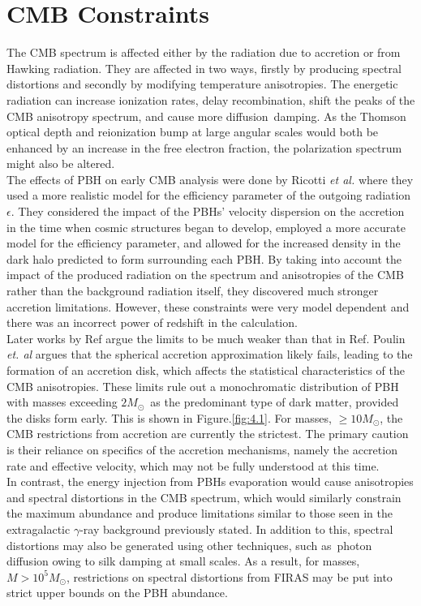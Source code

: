 \section{CMB Constraints}
The CMB spectrum is affected either by the radiation due to accretion or from Hawking radiation. They are affected in two ways, firstly by producing spectral distortions and secondly by modifying temperature anisotropies. The energetic radiation can increase ionization rates, delay recombination, shift the peaks of the CMB anisotropy spectrum, and cause more diffusion damping. As the Thomson optical depth and reionization bump at large angular scales would both be enhanced by an increase in the free electron fraction, the polarization spectrum might also be altered.\\
The effects of PBH on early CMB analysis were done by Ricotti \emph{et al.} \cite{Ricotti:2007au} where they used a more realistic model for the efficiency parameter of the outgoing radiation $\epsilon$. They considered the impact of the PBHs' velocity dispersion on the accretion in the time when cosmic structures began to develop, employed a more accurate model for the efficiency parameter, and allowed for the increased density in the dark halo predicted to form surrounding each PBH. By taking into account the impact of the produced radiation on the spectrum and anisotropies of the CMB rather than the background radiation itself, they discovered much stronger accretion limitations. However, these constraints were very model dependent and there was an incorrect power of redshift in the calculation. \\
Later works by Ref \cite{Ali-Haimoud:2016mbv}\cite{Horowitz:2016lib} argue the limits to be much weaker than that in Ref. \cite{Ricotti:2007au}
Poulin \emph{et. al} \cite{Poulin:2017bwe} \cite{Serpico:2020ehh} argues that the spherical accretion approximation likely fails, leading to the formation of an accretion disk, which affects the statistical characteristics of the CMB anisotropies. These limits rule out a monochromatic distribution of PBH with masses exceeding $2 M_\odot$ as the predominant type of dark matter, provided the disks form early. This is shown in Figure.\ref{fig:4.1}. For masses, $\geq 10M_\odot$, the CMB restrictions from accretion are currently the strictest. The primary caution is their reliance on specifics of the accretion mechanisms, namely the accretion rate and effective velocity, which may not be fully understood at this time.\\
In contrast, the energy injection from PBHs evaporation would cause anisotropies and spectral distortions in the CMB spectrum, which would similarly constrain the maximum abundance and produce limitations similar to those seen in the extragalactic $\gamma$-ray background previously stated\cite{Acharya:2019xla}\cite{Clark:2016nst}. In addition to this, spectral distortions may also be generated using other techniques, such as photon diffusion owing to silk damping at small scales. As a result, for masses, $M > 10^5 M_{\odot}$, restrictions on spectral distortions from FIRAS may be put into strict upper bounds on the PBH abundance\cite{Nakama:2017xvq}.



